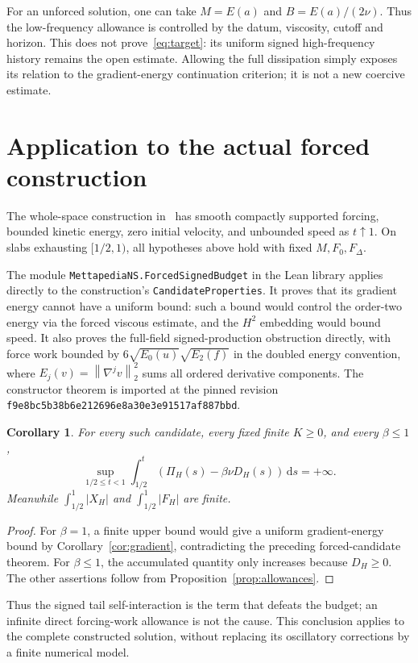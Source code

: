 \documentclass[11pt]{article}
\newtheorem{corollary}[proposition]{Corollary}
\newcommand{\dd}{\,\mathrm d}
\newcommand{\norm}[1]{\left\lVert#1\right\rVert}
\begin{document}
For an unforced solution, one can take $M=E(a)$ and $B=E(a)/(2\nu)$.
Thus the low-frequency allowance is controlled by the datum, viscosity,
cutoff and horizon. This does not prove~\eqref{eq:target}: its uniform
signed high-frequency history remains the open estimate. Allowing the
full dissipation simply exposes its relation to the gradient-energy
continuation criterion; it is not a new coercive estimate.

\section{Application to the actual forced construction}

The whole-space construction in~\cite{OAI} has smooth compactly supported
forcing, bounded kinetic energy, zero initial velocity, and unbounded
speed as $t\uparrow1$. On slabs exhausting $[1/2,1)$, all hypotheses
above hold with fixed $M,F_0,F_\Delta$.

The module \texttt{MettapediaNS.\allowbreak ForcedSignedBudget} in the Lean
library applies directly to the construction's \texttt{CandidateProperties}.
It proves
that its gradient energy cannot have a uniform bound: such a bound
would control the order-two energy via the forced viscous estimate,
and the $H^2$ embedding would bound speed. It also proves the full-field
signed-production obstruction directly, with force work bounded by
$6\sqrt{E_0(u)}\sqrt{E_2(f)}$ in the doubled energy convention, where
$E_j(v)=\norm{\nabla^jv}_2^2$ sums all ordered derivative components.
The constructor theorem is imported at the pinned revision
\texttt{f9e8bc5b38b6e212696e8a30e3e91517af887bbd}.

\begin{corollary}\label{cor:forced}
For every such candidate, every fixed finite $K\geq0$, and every
$\beta\leq1$,
\[
 \sup_{1/2\leq t<1}\int_{1/2}^t
       (\Pi_H(s)-\beta\nu D_H(s))\dd s=+\infty.
\]
Meanwhile $\int_{1/2}^1|X_H|$ and $\int_{1/2}^1|F_H|$ are finite.
\end{corollary}
\begin{proof}
For $\beta=1$, a finite upper bound would give a uniform gradient-energy
bound by Corollary~\ref{cor:gradient}, contradicting the preceding
forced-candidate theorem. For $\beta\leq1$, the accumulated quantity
only increases because $D_H\geq0$. The other assertions follow from
Proposition~\ref{prop:allowances}.
\end{proof}

Thus the signed tail self-interaction is the term that defeats the
budget; an infinite direct forcing-work allowance is not the cause.
This conclusion applies to the complete constructed solution, without
replacing its oscillatory corrections by a finite numerical model.
\end{document}
